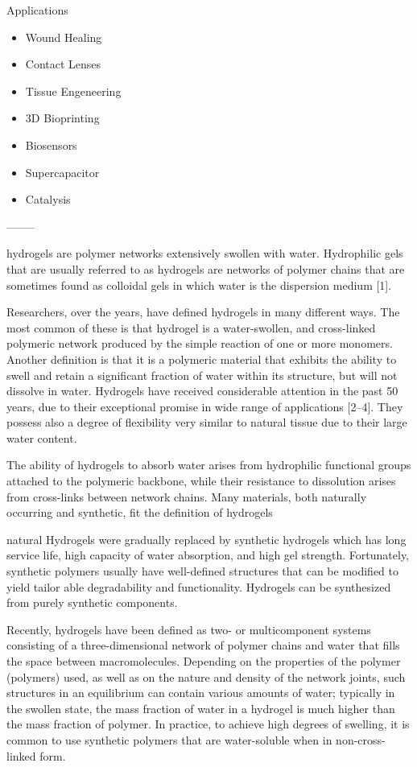 \documentclass[../../main-notes.tex]{subfiles}
\begin{document}
Applications 

\begin{itemize}
    \item Wound Healing
    \item Contact Lenses
    \item Tissue Engeneering
    \item 3D Bioprinting
    \item Biosensors
    \item Supercapacitor
    \item Catalysis
\end{itemize}

--------


\citep{ahmedHydrogelPreparationCharacterization2015a}

hydrogels are polymer networks extensively swollen with water.
Hydrophilic gels that are usually referred to as hydrogels are networks of polymer chains that are sometimes found as colloidal gels in which water is the dispersion medium [1].

Researchers, over the years, have defined hydrogels in many different ways. 
The most common of these is that hydrogel is a water-swollen, and cross-linked polymeric network produced by the simple reaction of one or more monomers. 
Another definition is that it is a polymeric material that exhibits the ability to swell and retain a significant fraction of water within its structure, but will not dissolve in water. 
Hydrogels have received considerable attention in the past 50 years, due to their exceptional promise in wide range of applications [2–4]. 
They possess also a degree of flexibility very similar to natural tissue due to their large water content.

The ability of hydrogels to absorb water arises from hydrophilic functional groups attached to the polymeric backbone, while their resistance to dissolution arises from cross-links between network chains. 
Many materials, both naturally occurring and synthetic, fit the definition of hydrogels

natural Hydrogels were gradually replaced by synthetic hydrogels which has long service life, high capacity of water absorption, and high gel strength. Fortunately, synthetic polymers usually have well-defined structures that can be modified to yield tailor able degradability and functionality. Hydrogels can be synthesized from purely synthetic components.

Recently, hydrogels have been defined as two- or multicomponent systems consisting of a three-dimensional network of polymer chains and water that fills the space between macromolecules. 
Depending on the properties of the polymer (polymers) used, as well as on the nature and density of the network joints, such structures in an equilibrium can contain various amounts of water; 
typically in the swollen state, the mass fraction of water in a hydrogel is much higher than the mass fraction of polymer. 
In practice, to achieve high degrees of swelling, it is common to use synthetic polymers that are water-soluble when in non-cross-linked form.
\end{document}
